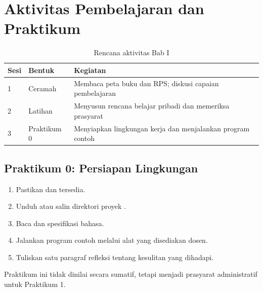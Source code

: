 \section*{Aktivitas Pembelajaran dan Praktikum}

\begin{table}[H]
\centering
\caption{Rencana aktivitas Bab I}
\label{tab:ch01-aktivitas}
\begin{tabularx}{\textwidth}{@{}llX@{}}
\toprule
\textbf{Sesi} & \textbf{Bentuk} & \textbf{Kegiatan} \\
\midrule
1 & Ceramah & Membaca peta buku dan RPS; diskusi capaian pembelajaran \\
2 & Latihan & Menyusun rencana belajar pribadi dan memeriksa prasyarat \\
3 & Praktikum 0 & Menyiapkan lingkungan kerja dan menjalankan program contoh \\
\bottomrule
\end{tabularx}
\end{table}

\subsection*{Praktikum 0: Persiapan Lingkungan}
\begin{enumerate}[label=\arabic*.,leftmargin=*]
  \item Pastikan  dan  tersedia.
  \item Unduh atau salin direktori proyek .
  \item Baca  dan spesifikasi bahasa.
  \item Jalankan program contoh  melalui alat yang
        disediakan dosen.
  \item Tuliskan satu paragraf refleksi tentang kesulitan yang dihadapi.
\end{enumerate}

Praktikum ini tidak dinilai secara sumatif, tetapi menjadi prasyarat
administratif untuk Praktikum 1.
